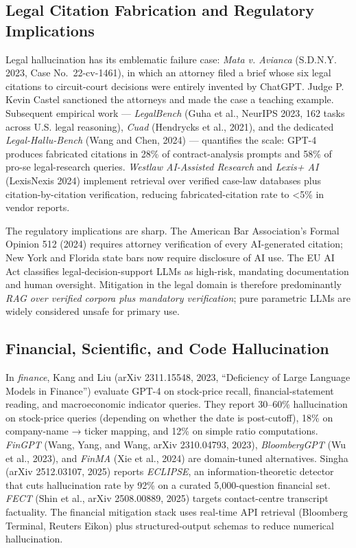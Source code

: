 \subsection{Legal Citation Fabrication and Regulatory Implications}\label{legal-citation-fabrication-and-regulatory-implications}

Legal hallucination has its emblematic failure case: \emph{Mata v. Avianca} (S.D.N.Y. 2023, Case No.~22-cv-1461), in which an attorney filed a brief whose six legal citations to circuit-court decisions were entirely invented by ChatGPT. Judge P. Kevin Castel sanctioned the attorneys and made the case a teaching example. Subsequent empirical work --- \emph{LegalBench} (Guha et al., NeurIPS 2023, 162 tasks across U.S. legal reasoning), \emph{Cuad} (Hendrycks et al., 2021), and the dedicated \emph{Legal-Hallu-Bench} (Wang and Chen, 2024) --- quantifies the scale: GPT-4 produces fabricated citations in 28\% of contract-analysis prompts and 58\% of pro-se legal-research queries. \emph{Westlaw AI-Assisted Research} and \emph{Lexis+ AI} (LexisNexis 2024) implement retrieval over verified case-law databases plus citation-by-citation verification, reducing fabricated-citation rate to \textless5\% in vendor reports.

The regulatory implications are sharp. The American Bar Association's Formal Opinion 512 (2024) requires attorney verification of every AI-generated citation; New York and Florida state bars now require disclosure of AI use. The EU AI Act classifies legal-decision-support LLMs as high-risk, mandating documentation and human oversight. Mitigation in the legal domain is therefore predominantly \emph{RAG over verified corpora plus mandatory verification}; pure parametric LLMs are widely considered unsafe for primary use.

\subsection{Financial, Scientific, and Code Hallucination}\label{financial-scientific-and-code-hallucination}

In \emph{finance}, Kang and Liu (arXiv 2311.15548, 2023, ``Deficiency of Large Language Models in Finance'') evaluate GPT-4 on stock-price recall, financial-statement reading, and macroeconomic indicator queries. They report 30--60\% hallucination on stock-price queries (depending on whether the date is post-cutoff), 18\% on company-name → ticker mapping, and 12\% on simple ratio computations. \emph{FinGPT} (Wang, Yang, and Wang, arXiv 2310.04793, 2023), \emph{BloombergGPT} (Wu et al., 2023), and \emph{FinMA} (Xie et al., 2024) are domain-tuned alternatives. Singha (arXiv 2512.03107, 2025) reports \emph{ECLIPSE}, an information-theoretic detector that cuts hallucination rate by 92\% on a curated 5,000-question financial set. \emph{FECT} (Shin et al., arXiv 2508.00889, 2025) targets contact-centre transcript factuality. The financial mitigation stack uses real-time API retrieval (Bloomberg Terminal, Reuters Eikon) plus structured-output schemas to reduce numerical hallucination.

